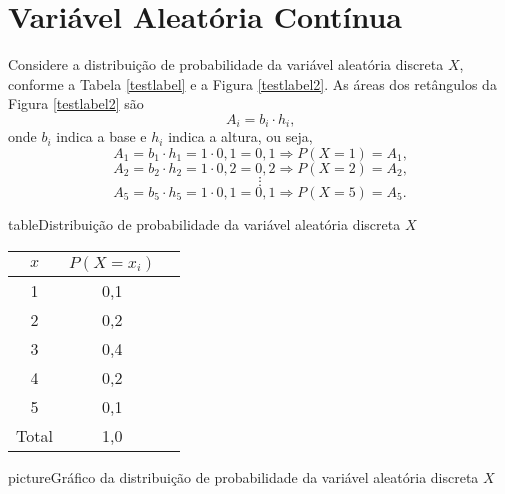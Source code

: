 \opensidepicturearea
\chapter{Variável Aleatória Contínua}

\nocite{livro_bussab_morettin}
Considere a distribuição de probabilidade da variável aleatória discreta $X$, conforme a Tabela \ref{testlabel} e a Figura \ref{testlabel2}. As áreas dos retângulos da Figura \ref{testlabel2} são 
\[
	A_i = b_i\cdot h_i
	\text{,}
\]
onde $b_i$ indica a base e $h_i$ indica a altura, ou seja,
\[
	A_1 = b_1 \cdot h_1 = 1 \cdot 0,1 = 0,1 \Longrightarrow P(X=1)=A_1
	\text{,}
\]
\[
	A_2 = b_2 \cdot h_2 = 1 \cdot 0,2 = 0,2 \Longrightarrow P(X=2)=A_2
	\text{,}
\]
\[
	\vdots
\]
\[
	A_5 = b_5 \cdot h_5 = 1 \cdot 0,1 = 0,1 \Longrightarrow P(X=5)=A_5
	\text{.}
\]

\begin{sidepicture}{7cm}{table}{Distribuição de probabilidade da variável aleatória discreta $X$}
	\label{testlabel}
	\begin{tabular}{ccc}\\\toprule  
		$x$ & $P(X=x_i)$ \\ \midrule
		1 & 0,1 \\
		2 & 0,2 \\ 
		3 & 0,4 \\
		4 & 0,2 \\
		5 & 0,1 \\ \midrule
		Total & 1,0\\  \bottomrule
	\end{tabular}
\end{sidepicture}

\begin{sidepicture}{1cm}{picture}{Gráfico da distribuição de probabilidade da variável aleatória discreta $X$}
	\label{testlabel2}
\end{sidepicture}

